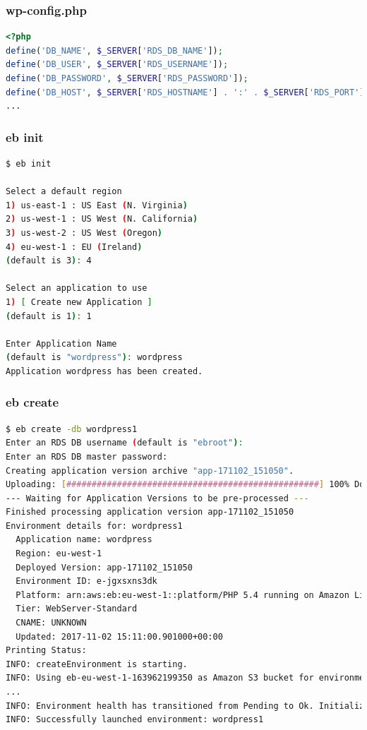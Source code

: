 \documentclass[aspectratio=169,grey,smaller]{beamer}
\begin{document}
\begin{frame}[fragile]
  \frametitle{wp-config.php}
  \begin{lstlisting}[language=PHP]
<?php
define('DB_NAME', $_SERVER['RDS_DB_NAME']);
define('DB_USER', $_SERVER['RDS_USERNAME']);
define('DB_PASSWORD', $_SERVER['RDS_PASSWORD']);
define('DB_HOST', $_SERVER['RDS_HOSTNAME'] . ':' . $_SERVER['RDS_PORT']);
...
  \end{lstlisting}
\end{frame}

\begin{frame}[fragile]
  \frametitle{eb init}
  \begin{lstlisting}[language=Bash]
$ eb init

Select a default region
1) us-east-1 : US East (N. Virginia)
2) us-west-1 : US West (N. California)
3) us-west-2 : US West (Oregon)
4) eu-west-1 : EU (Ireland)
(default is 3): 4

Select an application to use
1) [ Create new Application ]
(default is 1): 1

Enter Application Name
(default is "wordpress"): wordpress
Application wordpress has been created.
  \end{lstlisting}
\end{frame}

\begin{frame}[fragile]
  \frametitle{eb create}
  \scriptsize
  \begin{lstlisting}[language=Bash]
$ eb create -db wordpress1
Enter an RDS DB username (default is "ebroot"):
Enter an RDS DB master password:
Creating application version archive "app-171102_151050".
Uploading: [##################################################] 100% Done...
--- Waiting for Application Versions to be pre-processed ---
Finished processing application version app-171102_151050
Environment details for: wordpress1
  Application name: wordpress
  Region: eu-west-1
  Deployed Version: app-171102_151050
  Environment ID: e-jgxsxns3dk
  Platform: arn:aws:eb:eu-west-1::platform/PHP 5.4 running on Amazon Linux/2.5.0
  Tier: WebServer-Standard
  CNAME: UNKNOWN
  Updated: 2017-11-02 15:11:00.901000+00:00
Printing Status:
INFO: createEnvironment is starting.
INFO: Using eb-eu-west-1-163962199350 as Amazon S3 bucket for environment data.
...
INFO: Environment health has transitioned from Pending to Ok. Initialization completed 2 seconds ago and took 9 minutes.
INFO: Successfully launched environment: wordpress1
  \end{lstlisting}
  \normalsize
\end{frame}
\end{document}
